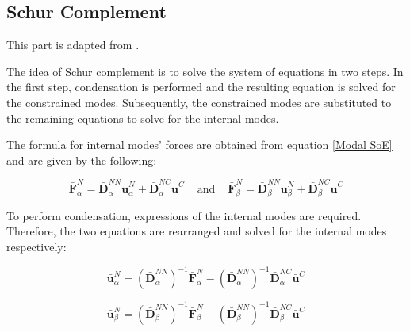 \documentclass[../DomainDecomposition.tex]{subfiles}
\begin{document}
\subsection{Schur Complement} 

This part is adapted from \cite{chatterjee2021multilevel}. 
\vspace{10pt} 

The idea of Schur complement is to solve the system of equations in two steps. 
In the first step, condensation is performed and the resulting equation is solved for the constrained modes. 
Subsequently, the constrained modes are substituted to the remaining equations to solve for the internal modes. 
\vspace{12pt} 

The formula for internal modes' forces are obtained from equation \eqref{Modal SoE} and are given by the following: 

\begin{equation*}
    \bar{\mathbf{F}}_{\alpha}^{N} 
    =
    \bar{\mathbf{D}}_{\alpha}^{NN} \bar{\mathbf{u}}_{\alpha}^{N} 
    +
    \bar{\mathbf{D}}_{\alpha}^{NC} \bar{\mathbf{u}}^{C} 
    \phantom{xx} 
    \text{and} 
    \phantom{xx} 
    \bar{\mathbf{F}}_{\beta}^{N} 
    =
    \bar{\mathbf{D}}_{\beta}^{NN} \bar{\mathbf{u}}_{\beta}^{N} 
    +
    \bar{\mathbf{D}}_{\beta}^{NC} \bar{\mathbf{u}}^{C} 
\end{equation*}

To perform condensation, expressions of the internal modes are required. 
Therefore, the two equations are rearranged and solved for the internal modes respectively: 

\begin{equation}
    \bar{\mathbf{u}}_{\alpha}^{N} 
    =
    \left(
        \bar{\mathbf{D}}_{\alpha}^{NN}
    \right)^{-1} 
    \bar{\mathbf{F}}_{\alpha}^{N} 
    -
    \left(
        \bar{\mathbf{D}}_{\alpha}^{NN}
    \right)^{-1} 
    \bar{\mathbf{D}}_{\alpha}^{NC} \bar{\mathbf{u}}^{C} 
\label{Internal Freedom Schur 1} 
\end{equation}


\begin{equation}
    \bar{\mathbf{u}}_{\beta}^{N} 
    =
    \left(
        \bar{\mathbf{D}}_{\beta}^{NN}
    \right)^{-1} 
    \bar{\mathbf{F}}_{\beta}^{N} 
    -
    \left(
        \bar{\mathbf{D}}_{\beta}^{NN}
    \right)^{-1} 
    \bar{\mathbf{D}}_{\beta}^{NC} \bar{\mathbf{u}}^{C} 
\label{Internal Freedom Schur 2} 
\end{equation}
\end{document}
